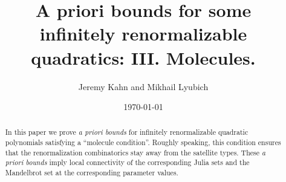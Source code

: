 \documentclass[12pt]{amsart}
\begin{document}
\bigskip\bigskip

\title[Molecules]{A priori bounds for some\\ infinitely renormalizable quadratics:
  {\small III. Molecules.} }
\author {Jeremy Kahn and Mikhail Lyubich}
\date{\today}



\begin{abstract} 
  In this paper we prove {\it a priori bounds} for infinitely renormalizable quadratic
polynomials satisfying a ``molecule condition''. Roughly speaking, this condition ensures that
the renormalization combinatorics stay away from the satellite types. These {\it a priori bounds}
imply local connectivity of the corresponding Julia sets and the Mandelbrot set at the corresponding parameter
values.   
\end{abstract}

\setcounter{tocdepth}{1}
 
\maketitle
\thispagestyle{empty}

\tableofcontents











\end{document}
